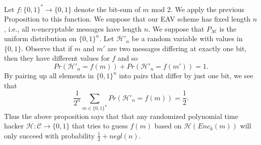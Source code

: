 \documentclass[twoside, a4paper, 10pt]{amsart}
\begin{document}
\begin{eg} Let $f:\{0,1\}^* \to \{0, 1\}$ denote the bit-sum of $m$ mod $2$. We apply the previous Proposition to this function. We suppose that our EAV scheme has fixed length $n$, i.e., all $n$-encryptable messages have length $n$. We suppose that $P_{\mathcal{M}}$ is the uniform distribution on $\{0,1\}^n$. Let $\mathcal{H}'_n$ be a random variable with values in $\{0,1\}$. Observe that if $m$ and $m'$ are two messages differing at exactly one bit, then they have different values for $f$ and so $$Pr(\mathcal{H}'_n = f(m)) + Pr(\mathcal{H}'_n = f(m')) = 1.$$ By pairing up all elements in $\{0,1\}^n$ into pairs that differ by just one bit, we see that  $$\frac{1}{2^n} \sum_{ m \in \{0,1\}^n} Pr(\mathcal{H}'_n = f(m)) = \frac{1}{2}.$$ Thus the above proposition says that that any randomized polynomial time hacker $\mathcal{H}:\mathcal{C} \to \{0,1\}$ that tries to guess $f(m)$ based on $\mathcal{H}(Enc_k(m))$ will only succeed with probability $\frac{1}{2} + negl(n)$.

\end{eg}
\end{document}

